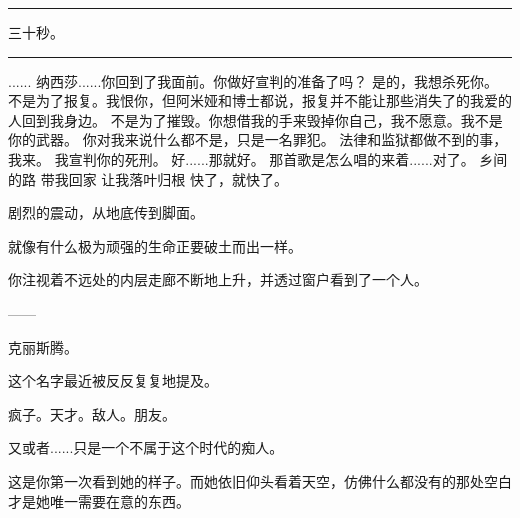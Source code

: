 \documentclass[openany]{book}
\begin{document}
\par\noindent\rule{\textwidth}{0.4pt}\par
三十秒。
\par\noindent\rule{\textwidth}{0.4pt}

\begin{dialogue}
     ......
     纳西莎......你回到了我面前。你做好宣判的准备了吗？
     是的，我想杀死你。
     不是为了报复。我恨你，但阿米娅和博士都说，报复并不能让那些消失了的我爱的人回到我身边。
     不是为了摧毁。你想借我的手来毁掉你自己，我不愿意。我不是你的武器。
     你对我来说什么都不是，只是一名罪犯。
     法律和监狱都做不到的事，我来。
     我宣判你的死刑。
     好......那就好。
     那首歌是怎么唱的来着......对了。
     乡间的路 带我回家
     让我落叶归根
     快了，就快了。
\end{dialogue}\par

剧烈的震动，从地底传到脚面。\par
就像有什么极为顽强的生命正要破土而出一样。\par
你注视着不远处的内层走廊不断地上升，并透过窗户看到了一个人。

\begin{dialogue}
     ——
\end{dialogue}\par
克丽斯腾。\par
这个名字最近被反反复复地提及。\par
疯子。天才。敌人。朋友。\par
又或者......只是一个不属于这个时代的痴人。\par
这是你第一次看到她的样子。而她依旧仰头看着天空，仿佛什么都没有的那处空白才是她唯一需要在意的东西。\par
\end{document}
